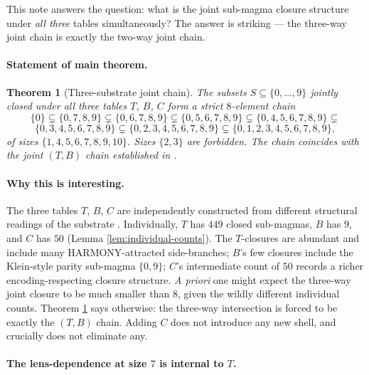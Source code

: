\documentclass[11pt,reqno]{amsart}
\newtheorem{theorem}{Theorem}[section]
\theoremstyle{definition}
\begin{document}
This note answers the question: what is the joint sub-magma
closure structure under \emph{all three} tables simultaneously?
The answer is striking — the three-way joint chain is exactly the
two-way joint chain.

\paragraph{Statement of main theorem.}

\begin{theorem}[Three-substrate joint chain]
\label{thm:three-table-chain}
The subsets $S\subseteq\{0,\dots,9\}$ jointly closed under all
three tables $T$, $B$, $C$ form a strict $8$-element chain
\[
  \{0\} \subsetneq \{0,7,8,9\} \subsetneq \{0,6,7,8,9\}
  \subsetneq \{0,5,6,7,8,9\} \subsetneq \{0,4,5,6,7,8,9\}
  \subsetneq
\]
\[
  \{0,3,4,5,6,7,8,9\} \subsetneq \{0,2,3,4,5,6,7,8,9\}
  \subsetneq \{0,1,2,3,4,5,6,7,8,9\},
\]
of sizes $\{1,4,5,6,7,8,9,10\}$. Sizes $\{2,3\}$ are forbidden.
The chain coincides with the joint $(T,B)$ chain established in
\cite{Sanders2026FourCore}.
\end{theorem}

\paragraph{Why this is interesting.}

The three tables $T$, $B$, $C$ are independently constructed from
different structural readings of the substrate
\cite{Gen13Foundations}. Individually, $T$ has $449$ closed
sub-magmas, $B$ has $9$, and $C$ has $50$ (Lemma
\ref{lem:individual-counts}). The $T$-closures are abundant and
include many HARMONY-attracted side-branches; $B$'s few closures
include the Klein-style parity sub-magma $\{0,9\}$; $C$'s
intermediate count of $50$ records a richer encoding-respecting
closure structure. \emph{A priori} one might expect the three-way
joint closure to be much smaller than $8$, given the wildly
different individual counts. Theorem \ref{thm:three-table-chain}
says otherwise: the three-way intersection is forced to be
exactly the $(T,B)$ chain. Adding $C$ does not introduce any new
shell, and crucially does not eliminate any.

\paragraph{The lens-dependence at size $7$ is internal to $T$.}
\end{document}
